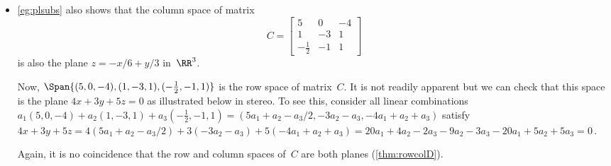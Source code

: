 \begin{example}
\begin{itemize}
\item \autoref{eg:plsubs} also shows that the column space of matrix
\begin{equation*}
C=\begin{bmatrix} 5&0&-4\\1&-3&1\\-\frac12&-1&1 \end{bmatrix}
\end{equation*}
is also the plane \(z=-x/6+y/3\) in~\(\RR^3\).

Now, \(\Span\{(5,0,-4),(1,-3,1),(-\frac12,-1,1)\}\) is the row space of matrix~\(C\).
It is not readily apparent but we can check that this space is the plane \(4x+3y+5z=0\) as illustrated below in stereo.
To see this, consider all linear combinations \(a_1(5,0,-4)+a_2(1,-3,1)+a_3(-\frac12,-1,1)
=(5a_1+a_2-a_3/2, -3a_2-a_3, -4a_1+a_2+a_3)\) satisfy
\(4x+3y+5z
=4(5a_1+a_2-a_3/2)+3(-3a_2-a_3)+5(-4a_1+a_2+a_3)
=20a_1+4a_2-2a_3-9a_2-3a_3-20a_1+5a_2+5a_3
=0\)\,.
\begin{center}
%
\end{center}
Again, it is no coincidence that the row and column spaces of~\(C\) are both planes (\autoref{thm:rowcolD}).
\end{itemize}
\end{example}





